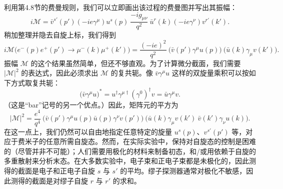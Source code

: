 利用第4.8节的费曼规则，我们可以立即画出该过程的费曼图并写出其振幅：
\begin{equation}
  i\mathcal{M} = \bar{v}^{s'}(p')(-ie\gamma^\mu)u^s(p)\
    \frac{-ig_{\mu\nu}}{q^2}\ \bar{u}^{r}(k)(-ie\gamma^\nu)v^{r'}(k').
\end{equation}
稍加整理并隐去自旋上标，我们得到
\begin{equation}
  i\mathcal{M}\bigl( e^{-}(p)e^{+}(p') \to \mu^{-}(k)\mu^{+}(k') \bigr)
    = \frac{(-ie)^2}{q^2}\ \bigl( \bar{v}(p')\gamma^\mu u(p) \bigr)\
      \bigl( \bar{u}(k)\gamma_\mu v(k') \bigr) .
  \label{eq:5.1}
\end{equation}
振幅 $\mathcal{M}$ 的这个结果虽然简单，但还不够直观。为了计算微分截面，我们需要 $|\mathcal{M}|^2$ 的表达式，因此必须求出 $\mathcal{M}$ 的复共轭。像 $\bar{v}\gamma^\mu u$ 这样的双旋量乘积可以按如下方式取复共轭：
\begin{equation}
  \bigl( \bar{v}\gamma^\mu u \bigr)^{*}
    = u^{\dagger}\gamma^{\mu\dagger}(\gamma^0)^{\dagger}v
    = \bar{u}\gamma^\mu v .
\end{equation}
（这是``bar''记号的另一个优点。）因此，矩阵元的平方为
\begin{equation}
  |\mathcal{M}|^2 = \frac{e^4}{q^4}\ \bigl( \bar{v}(p')\gamma^\mu u(p)
    \bar{u}(p)\gamma^\nu v(p') \bigr)\
    \bigl( \bar{u}(k)\gamma_\mu v(k')\ \bar{v}(k')\gamma_\nu u(k) \bigr).
  \label{eq:5.2}
\end{equation}
在这一点上，我们仍然可以自由地指定任意特定的旋量 $u^s(p)$、$v^{s'}(p')$ 等，对应于费米子的任意所需自旋态。然而，在实际实验中，保持对自旋态的控制是困难的（尽管并非不可能）；人们需要用极化的材料来制备初态，和/或用依赖于自旋的多重散射来分析末态。在大多数实验中，电子束和正电子束都是未极化的，因此测得的截面是电子和正电子自旋 $s$ 与 $s'$ 的平均。缪子探测器通常对极化不敏感，因此测得的截面是对缪子自旋 $r$ 与 $r'$ 的求和。

